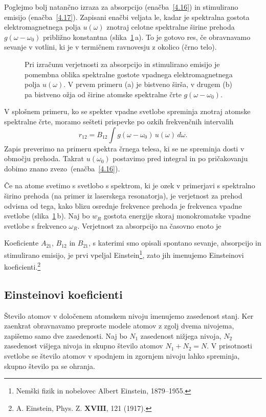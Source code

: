 Poglejmo bolj natančno izraza za absorpcijo
(enačba~\ref{4.16}) in stimulirano emisijo (enačba~\ref{4.17}).
Zapisani enačbi veljata le, kadar je spektralna gostota 
elektromagnetnega polja $u(\omega)$
znotraj celotne spektralne širine prehoda $g(\omega - \omega_0)$ približno konstantna 
(slika~\ref{fig:spektri}\,a). To je gotovo res, če
obravnavamo sevanje v votlini, ki je v termičnem ravnovesju z okolico (črno telo).

\begin{figure}[h]
\centering
\def\svgwidth{140truemm} 

\caption{Pri izračunu verjetnosti za absorpcijo in stimulirano emisijo je 
pomembna oblika spektralne gostote vpadnega elektromagnetnega polja $u(\omega)$. V prvem primeru (a) je 
bistveno širša, v drugem (b) pa bistveno ožja od širine atomske spektralne črte $g(\omega-\omega_0)$.}
\label{fig:spektri}
\end{figure}

V splošnem primeru, ko se spekter vpadne svetlobe spreminja znotraj 
atomske spektralne črte, moramo sešteti prispevke po ozkih frekvenčnih intervalih
\begin{equation}
r_{12}=B_{12}\int g(\omega-\omega_0)\, u(\omega)\, d\omega.
\label{4.19}
\end{equation}
Zapis preverimo na primeru spektra črnega telesa, ki se ne spreminja 
dosti v območju prehoda. Takrat $u(\omega_0)$ postavimo pred integral in po pričakovanju
dobimo znano zvezo~(enačba~\ref{4.16}). 

Če na atome svetimo s svetlobo s spektrom, ki je ozek v primerjavi s spektralno 
širino prehoda (na primer iz laserskega resonatorja), je verjetnost za prehod 
odvisna od tega, kako blizu osrednje frekvence prehoda je frekvenca vpadne 
svetlobe (slika~\ref{fig:spektri}\,b). Naj bo  $w_{R}$ gostota energije skoraj
monokromatske vpadne svetlobe s frekvenco $\omega_R$. Verjetnost za absorpcijo na časovno 
enoto je

Koeficiente $A_{21}$, $B_{12}$ in $B_{21}$, s katerimi smo opisali spontano sevanje,
absorpcijo in stimulirano emisijo, je prvi vpeljal Einstein\footnote{Nemški fizik
in nobelovec Albert Einstein, 1879--1955.}, zato jih imenujemo 
Einsteinovi koeficienti.\footnote{A. Einstein,
Phys. Z. $\mathbf{XVIII}$, 121 (1917).} 

\subsection*{Einsteinovi koeficienti}
\label{AB}
Število atomov v določenem atomskem nivoju imenujemo zasedenost stanj. 
Ker zaenkrat obravnavamo preproste modele atomov z zgolj 
dvema nivojema, zapišemo samo dve zasedenosti. Naj bo $N_1$ zasedenost 
nižjega nivoja, $N_{2}$ zasedenost višjega nivoja in skupno število atomov 
$N_1+N_2=N$. V prisotnosti svetlobe se število atomov v spodnjem in zgornjem 
nivoju lahko spreminja, skupno število pa se ohranja.

